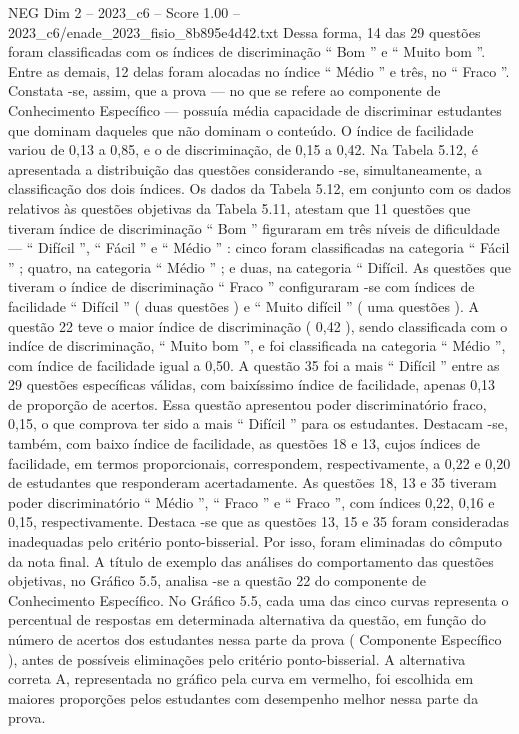 \begin{textsample}{NEG Dim 2 – 2023\_c6 – Score 1.00 – 2023\_c6/enade\_2023\_fisio\_8b895e4d42.txt}
Dessa forma, 14 das 29 questões foram classificadas com os índices de discriminação “ Bom ” e “ Muito bom ”.
Entre as demais, 12 delas foram alocadas no índice “ Médio ” e três, no “ Fraco ”.
Constata -se, assim, que a prova — no que se refere ao componente de Conhecimento Específico — possuía média capacidade de discriminar estudantes que dominam daqueles que não dominam o conteúdo.
O índice de facilidade variou de 0,13 a 0,85, e o de discriminação, de 0,15 a 0,42.
Na Tabela 5.12, é apresentada a distribuição das questões considerando -se, simultaneamente, a classificação dos dois índices.
Os dados da Tabela 5.12, em conjunto com os dados relativos às questões objetivas da Tabela 5.11, atestam que 11 questões que tiveram índice de discriminação “ Bom ” figuraram em três níveis de dificuldade — “ Difícil ”, “ Fácil ” e “ Médio ” : cinco foram classificadas na categoria “ Fácil ” ; quatro, na categoria “ Médio ” ; e duas, na categoria “ Difícil.
As questões que tiveram o índice de discriminação “ Fraco ” configuraram -se com índices de facilidade “ Difícil ” ( duas questões ) e “ Muito difícil ” ( uma questões ).
A questão 22 teve o maior índice de discriminação ( 0,42 ), sendo classificada com o indíce de discriminação, “ Muito bom ”, e foi classificada na categoria “ Médio ”, com índice de facilidade igual a 0,50.
A questão 35 foi a mais “ Difícil ” entre as 29 questões específicas válidas, com baixíssimo índice de facilidade, apenas 0,13 de proporção de acertos.
Essa questão apresentou poder discriminatório fraco, 0,15, o que comprova ter sido a mais “ Difícil ” para os estudantes.
Destacam -se, também, com baixo índice de facilidade, as questões 18 e 13, cujos índices de facilidade, em termos proporcionais, correspondem, respectivamente, a 0,22 e 0,20 de estudantes que responderam acertadamente.
As questões 18, 13 e 35 tiveram poder discriminatório “ Médio ”, “ Fraco ” e “ Fraco ”, com índices 0,22, 0,16 e 0,15, respectivamente.
Destaca -se que as questões 13, 15 e 35 foram consideradas inadequadas pelo critério ponto-bisserial.
Por isso, foram eliminadas do cômputo da nota final.
A título de exemplo das análises do comportamento das questões objetivas, no Gráfico 5.5, analisa -se a questão 22 do componente de Conhecimento Específico.
No Gráfico 5.5, cada uma das cinco curvas representa o percentual de respostas em determinada alternativa da questão, em função do número de acertos dos estudantes nessa parte da prova ( Componente Específico ), antes de possíveis eliminações pelo critério ponto-bisserial.
A alternativa correta A, representada no gráfico pela curva em vermelho, foi escolhida em maiores proporções pelos estudantes com desempenho melhor nessa parte da prova.

\end{textsample}

